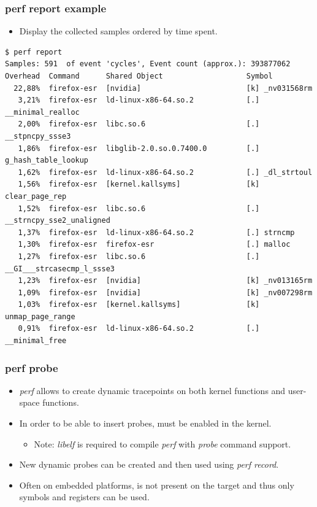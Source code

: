 \begin{frame}[fragile]
  \frametitle{perf report example}
  \begin{itemize}
    \item Display the collected samples ordered by time spent.
  \end{itemize}
  \begin{block}{}
    \begin{verbatim}
$ perf report
Samples: 591  of event 'cycles', Event count (approx.): 393877062
Overhead  Command      Shared Object                   Symbol
  22,88%  firefox-esr  [nvidia]                        [k] _nv031568rm
   3,21%  firefox-esr  ld-linux-x86-64.so.2            [.] __minimal_realloc
   2,00%  firefox-esr  libc.so.6                       [.] __stpncpy_ssse3
   1,86%  firefox-esr  libglib-2.0.so.0.7400.0         [.] g_hash_table_lookup
   1,62%  firefox-esr  ld-linux-x86-64.so.2            [.] _dl_strtoul
   1,56%  firefox-esr  [kernel.kallsyms]               [k] clear_page_rep
   1,52%  firefox-esr  libc.so.6                       [.] __strncpy_sse2_unaligned
   1,37%  firefox-esr  ld-linux-x86-64.so.2            [.] strncmp
   1,30%  firefox-esr  firefox-esr                     [.] malloc
   1,27%  firefox-esr  libc.so.6                       [.] __GI___strcasecmp_l_ssse3
   1,23%  firefox-esr  [nvidia]                        [k] _nv013165rm
   1,09%  firefox-esr  [nvidia]                        [k] _nv007298rm
   1,03%  firefox-esr  [kernel.kallsyms]               [k] unmap_page_range
   0,91%  firefox-esr  ld-linux-x86-64.so.2            [.] __minimal_free
    \end{verbatim}
  \end{block}
\end{frame}

\begin{frame}
  \frametitle{perf probe}
  \begin{itemize}
    \item {\em perf} allows to create dynamic tracepoints on both kernel functions and
          user-space functions.
    \item In order to be able to insert probes,  must be
          enabled in the kernel.
    \begin{itemize}
      \item Note: {\em libelf} is required to compile {\em perf} with
            {\em probe} command support.
    \end{itemize}
    \item New dynamic probes can be created and then used using
          {\em perf record}.
    \item Often on embedded platforms,  is not present on the
          target and thus only symbols and registers can be used.
  \end{itemize}
\end{frame}

